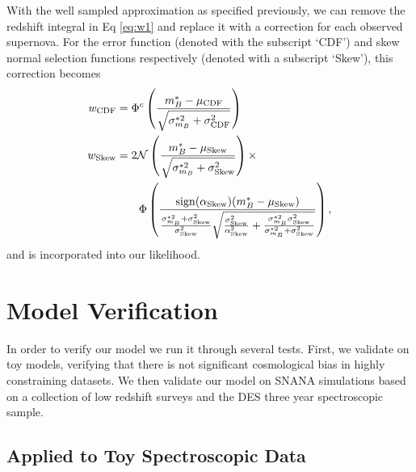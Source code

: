 \documentclass[a4paper,fleqn,usenatbib]{mnras}
\begin{document}
With the well sampled approximation as specified previously, we can remove the redshift integral in Eq \eqref{eq:w1} and replace it with a correction for each observed supernova. For the error function (denoted with the subscript `CDF') and skew normal selection functions respectively (denoted with a subscript `Skew'), this correction becomes
\begin{align}
w_{\rm CDF} &= \Phi^c\left(  \frac{m^*_B - \mu_{\rm CDF}}{\sqrt{\sigma^{*2}_{m_B} + \sigma_{\rm CDF}^2}}  \right) \label{eq:seldes}\\
w_{\rm Skew} &= 2\mathcal{N}\left( \frac{m_B^* - \mu_{\rm Skew}}{\sqrt{\sigma^{*2}_{m_B} + \sigma_{\rm Skew}^2}}\right) \times \notag\\
&\quad\quad \Phi\left(  \frac{{\rm sign}(\alpha_{\rm Skew})(m_B^* - \mu_{\rm Skew})}{\frac{\sigma_{m_B}^{*2} + \sigma^2_{\rm Skew}}{\sigma^2_{\rm Skew}} \sqrt{\frac{\sigma^2_{\rm Skew}}{\alpha^2_{\rm Skew}} + \frac{\sigma_{m_B}^{*2} \sigma^2_{\rm Skew}}{\sigma_{m_B}^{*2} + \sigma^2_{\rm Skew}}} }\right), \label{eq:sellowz}
\end{align}
and is incorporated into our likelihood.








\section{Model Verification}
\label{sec:verification}

In order to verify our model we run it through several tests. First, we validate on toy models, verifying that there is not significant cosmological bias in highly constraining datasets. We then validate our model on SNANA simulations based on a collection of low redshift surveys and the DES three year spectroscopic sample.

\subsection{Applied to Toy Spectroscopic Data}
\label{sec:toy}
\end{document}
